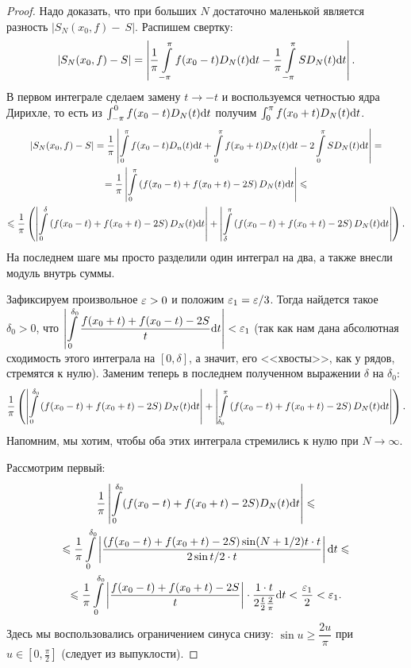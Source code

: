 \begin{proof}
Надо доказать, что при больших $N$ достаточно маленькой является разность $|S_N(x_0, f) -~S|$. Распишем свертку:
\begin{gather*}
|S_N(x_0, f) - S| = \left| \dfrac{1}{\pi} \int\limits_{-\pi}^{\pi}f(x_0 - t)D_N(t)\mathrm{d} t - \dfrac{1}{\pi} \int\limits_{-\pi}^{\pi}SD_N(t)\mathrm{d} t \right|.
\end{gather*}
В первом интеграле сделаем замену $t \to -t$ и воспользуемся четностью ядра Дирихле, то есть из $\int_{-\pi}^{0}f(x_0 - t)D_N(t)\mathrm{d} t$ получим $\int_0^\pi f(x_0 + t)D_N(t)\mathrm{d} t$.
\begin{gather*}
|S_N(x_0, f) - S| = \dfrac{1}{\pi} \left| \int\limits_0^\pi f(x_0 - t)D_n(t)\mathrm{d} t + \int\limits_0^{\pi} f(x_0 + t)D_N(t)\mathrm{d} t - 2\int\limits_0^\pi SD_N(t) \mathrm{d} t \right| = \\ = \dfrac{1}{\pi} \left| \int\limits_0^\pi \left( f(x_0 - t) + f(x_0 + t) - 2S  \right) D_N(t) \mathrm{d} t \right| \leqslant  \\
\leqslant \dfrac{1}{\pi} \left( \left| \int\limits_0^\delta \left( f(x_0 - t) + f(x_0 + t) - 2S  \right) D_N(t) \mathrm{d} t \right| + \left| \int\limits_\delta^\pi \left( f(x_0 - t) + f(x_0 + t) - 2S  \right) D_N(t) \mathrm{d} t \right| \right).
\end{gather*}
На последнем шаге мы просто разделили один интеграл на два, а также внесли модуль внутрь суммы.

Зафиксируем произвольное $\varepsilon > 0$ и положим $\varepsilon_1 = \varepsilon / 3$. Тогда найдется такое $\delta_0 > 0$, что $\left|\displaystyle \int\limits_0^{\delta_0}  \dfrac{f(x_0 + t) + f(x_0 - t) - 2S}{t}\mathrm{d} t \right| < \varepsilon_1$ (так как нам дана абсолютная сходимость этого интеграла на $[0, \delta]$, а значит, его <<хвосты>>, как у рядов, стремятся к нулю). Заменим теперь в последнем полученном выражении $\delta$ на $\delta_0$:
$$
\dfrac{1}{\pi} \left( \left| \int\limits_0^{\delta_0} \left( f(x_0 - t) + f(x_0 + t) - 2S  \right) D_N(t) \mathrm{d} t \right| + \left| \int\limits_{\delta_0}^\pi \left( f(x_0 - t) + f(x_0 + t) - 2S  \right) D_N(t) \mathrm{d} t \right| \right).
$$
Напомним, мы хотим, чтобы оба этих интеграла стремились к нулю при $N \to \infty$.

Рассмотрим первый:
\begin{multline}
\dfrac{1}{\pi} \left| \int\limits_0^{\delta_0} ( f(x_0 - t) + f(x_0 + t) - 2S  ) D_N(t) \mathrm{d} t \right|\leqslant \\ \leqslant \dfrac{1}{\pi}  \int\limits_0^{\delta_0} \left| \dfrac{(f(x_0 - t) + f(x_0 + t) - 2S) \sin (N + 1/2)t \cdot t}{2 \sin t/2 \cdot t} \right|\mathrm{d} t \leqslant \\
\leqslant \dfrac{1}{\pi}  \int\limits_0^{\delta_0} \left| \dfrac{f(x_0 - t) + f(x_0 + t) - 2S}{t} \right|  \cdot \dfrac{1 \cdot t}{2 \frac{t}{2} \frac{2}{\pi}} \mathrm{d} t < \dfrac{\varepsilon_1}{2} < \varepsilon_1.
\end{multline}
Здесь мы воспользовались ограничением синуса снизу: $\sin u \geq \dfrac{2u}{\pi}$ при $ u \in [0, \frac{\pi}{2}]$ (следует из выпуклости).


\end{proof}
